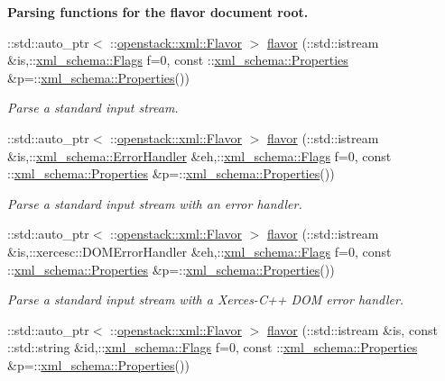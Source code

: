 \begin{Indent}{\bf Parsing functions for the flavor document root.}
\begin{DoxyCompactItemize}
::std::auto\_\-ptr$<$ ::\hyperlink{classopenstack_1_1xml_1_1Flavor}{openstack::xml::Flavor} $>$ \hyperlink{namespaceopenstack_1_1xml_afd4f88bcd132ee1e538a757403656ab2}{flavor} (::std::istream \&is,::\hyperlink{namespacexml__schema_affb4c227cbd9aa7453dd1dc5a1401943}{xml\_\-schema::Flags} f=0, const ::\hyperlink{namespacexml__schema_ad27ce19a7ee1d3b1064092648898f64c}{xml\_\-schema::Properties} \&p=::\hyperlink{namespacexml__schema_ad27ce19a7ee1d3b1064092648898f64c}{xml\_\-schema::Properties}())
\begin{DoxyCompactList}\small\item\em Parse a standard input stream. \item\end{DoxyCompactList}\item 
::std::auto\_\-ptr$<$ ::\hyperlink{classopenstack_1_1xml_1_1Flavor}{openstack::xml::Flavor} $>$ \hyperlink{namespaceopenstack_1_1xml_aeb9d7addf5e88634403a31df964484d5}{flavor} (::std::istream \&is,::\hyperlink{namespacexml__schema_ab1c9361bfd3b404eaabf0c31eded79dc}{xml\_\-schema::ErrorHandler} \&eh,::\hyperlink{namespacexml__schema_affb4c227cbd9aa7453dd1dc5a1401943}{xml\_\-schema::Flags} f=0, const ::\hyperlink{namespacexml__schema_ad27ce19a7ee1d3b1064092648898f64c}{xml\_\-schema::Properties} \&p=::\hyperlink{namespacexml__schema_ad27ce19a7ee1d3b1064092648898f64c}{xml\_\-schema::Properties}())
\begin{DoxyCompactList}\small\item\em Parse a standard input stream with an error handler. \item\end{DoxyCompactList}\item 
::std::auto\_\-ptr$<$ ::\hyperlink{classopenstack_1_1xml_1_1Flavor}{openstack::xml::Flavor} $>$ \hyperlink{namespaceopenstack_1_1xml_a769f9f569071e242f57555cf945d84bd}{flavor} (::std::istream \&is,::xercesc::DOMErrorHandler \&eh,::\hyperlink{namespacexml__schema_affb4c227cbd9aa7453dd1dc5a1401943}{xml\_\-schema::Flags} f=0, const ::\hyperlink{namespacexml__schema_ad27ce19a7ee1d3b1064092648898f64c}{xml\_\-schema::Properties} \&p=::\hyperlink{namespacexml__schema_ad27ce19a7ee1d3b1064092648898f64c}{xml\_\-schema::Properties}())
\begin{DoxyCompactList}\small\item\em Parse a standard input stream with a Xerces-\/C++ DOM error handler. \item\end{DoxyCompactList}\item 
::std::auto\_\-ptr$<$ ::\hyperlink{classopenstack_1_1xml_1_1Flavor}{openstack::xml::Flavor} $>$ \hyperlink{namespaceopenstack_1_1xml_a36428e605528b8eddc1e5bc4d84e32d3}{flavor} (::std::istream \&is, const ::std::string \&id,::\hyperlink{namespacexml__schema_affb4c227cbd9aa7453dd1dc5a1401943}{xml\_\-schema::Flags} f=0, const ::\hyperlink{namespacexml__schema_ad27ce19a7ee1d3b1064092648898f64c}{xml\_\-schema::Properties} \&p=::\hyperlink{namespacexml__schema_ad27ce19a7ee1d3b1064092648898f64c}{xml\_\-schema::Properties}())

\end{DoxyCompactItemize}
\end{Indent}
